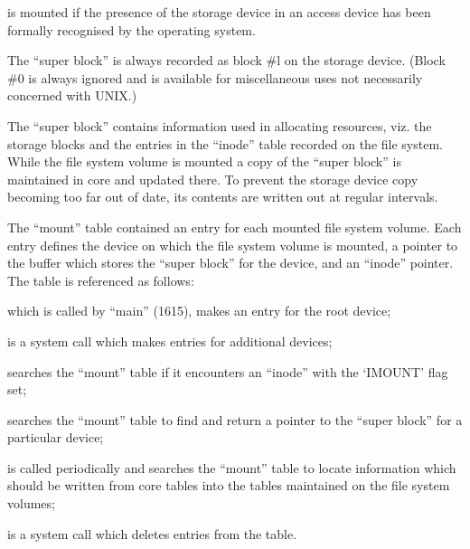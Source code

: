 \item[a file system volume] is mounted if
the presence of the storage device
in an access device has been  formally  recognised by the operating
system.
\ed



The ``super block'' is always recorded as
block  \#l on the storage device. (Block
\#0 is always ignored and  is  available
for  miscellaneous uses not necessarily
concerned with UNIX.)

The ``super block'' contains  information
used  in allocating resources, viz. the
storage blocks and the entries  in  the
``inode'' table recorded on the file system. While the file  system  volume  is
mounted  a copy of the ``super block'' is
maintained in core and  updated  there.
To  prevent  the  storage  device  copy
becoming too far out of date, its  contents are written out at regular intervals.



The ``mount'' table  contained  an  entry
for  each  mounted  file system volume.
Each entry defines the device on  which
the  file  system  volume is mounted, a
pointer to the buffer which stores  the
``super  block''  for  the device, and an
``inode'' pointer.  The table  is  referenced as follows:

\bd
\item[iinit (6922)] which  is  called  by
``main''  (1615), makes an entry for
the root device;

\item[smount (6086)]  is  a  system  call
which makes entries for additional
devices;

\item[iget (7276)] searches  the  ``mount''
table  if it encounters an ``inode''
with the `IMOUNT' flag set;

\item[getfs (7167)] searches the  ``mount''
table to find and return a pointer
to the ``super block'' for a particular device;

\item[update (7201)] is  called  periodically  and  searches  the  ``mount''
table to locate information  which
should be written from core tables
into the tables maintained on  the
file system volumes;

\item[sumount (6144)] is  a  system  call
which  deletes  entries  from  the
table.
\ed

